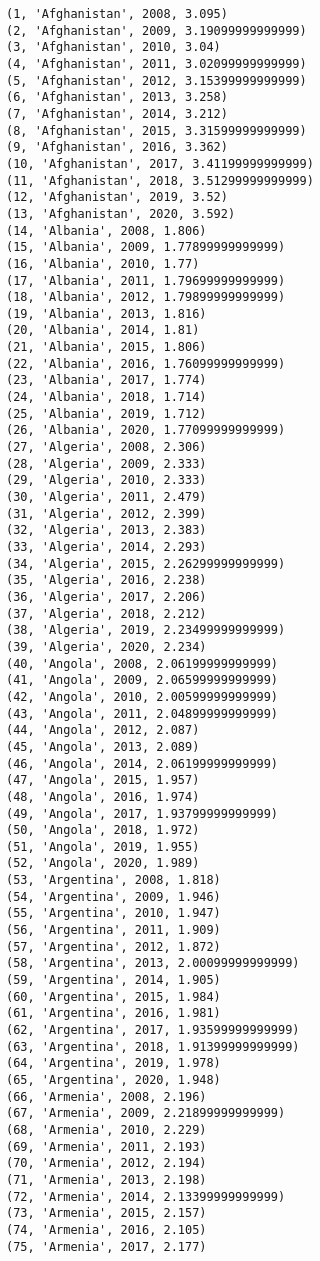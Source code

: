\documentclass[11pt]{article}
\begin{document}
    \begin{Verbatim}[commandchars=\\\{\}]
(1, 'Afghanistan', 2008, 3.095)
(2, 'Afghanistan', 2009, 3.19099999999999)
(3, 'Afghanistan', 2010, 3.04)
(4, 'Afghanistan', 2011, 3.02099999999999)
(5, 'Afghanistan', 2012, 3.15399999999999)
(6, 'Afghanistan', 2013, 3.258)
(7, 'Afghanistan', 2014, 3.212)
(8, 'Afghanistan', 2015, 3.31599999999999)
(9, 'Afghanistan', 2016, 3.362)
(10, 'Afghanistan', 2017, 3.41199999999999)
(11, 'Afghanistan', 2018, 3.51299999999999)
(12, 'Afghanistan', 2019, 3.52)
(13, 'Afghanistan', 2020, 3.592)
(14, 'Albania', 2008, 1.806)
(15, 'Albania', 2009, 1.77899999999999)
(16, 'Albania', 2010, 1.77)
(17, 'Albania', 2011, 1.79699999999999)
(18, 'Albania', 2012, 1.79899999999999)
(19, 'Albania', 2013, 1.816)
(20, 'Albania', 2014, 1.81)
(21, 'Albania', 2015, 1.806)
(22, 'Albania', 2016, 1.76099999999999)
(23, 'Albania', 2017, 1.774)
(24, 'Albania', 2018, 1.714)
(25, 'Albania', 2019, 1.712)
(26, 'Albania', 2020, 1.77099999999999)
(27, 'Algeria', 2008, 2.306)
(28, 'Algeria', 2009, 2.333)
(29, 'Algeria', 2010, 2.333)
(30, 'Algeria', 2011, 2.479)
(31, 'Algeria', 2012, 2.399)
(32, 'Algeria', 2013, 2.383)
(33, 'Algeria', 2014, 2.293)
(34, 'Algeria', 2015, 2.26299999999999)
(35, 'Algeria', 2016, 2.238)
(36, 'Algeria', 2017, 2.206)
(37, 'Algeria', 2018, 2.212)
(38, 'Algeria', 2019, 2.23499999999999)
(39, 'Algeria', 2020, 2.234)
(40, 'Angola', 2008, 2.06199999999999)
(41, 'Angola', 2009, 2.06599999999999)
(42, 'Angola', 2010, 2.00599999999999)
(43, 'Angola', 2011, 2.04899999999999)
(44, 'Angola', 2012, 2.087)
(45, 'Angola', 2013, 2.089)
(46, 'Angola', 2014, 2.06199999999999)
(47, 'Angola', 2015, 1.957)
(48, 'Angola', 2016, 1.974)
(49, 'Angola', 2017, 1.93799999999999)
(50, 'Angola', 2018, 1.972)
(51, 'Angola', 2019, 1.955)
(52, 'Angola', 2020, 1.989)
(53, 'Argentina', 2008, 1.818)
(54, 'Argentina', 2009, 1.946)
(55, 'Argentina', 2010, 1.947)
(56, 'Argentina', 2011, 1.909)
(57, 'Argentina', 2012, 1.872)
(58, 'Argentina', 2013, 2.00099999999999)
(59, 'Argentina', 2014, 1.905)
(60, 'Argentina', 2015, 1.984)
(61, 'Argentina', 2016, 1.981)
(62, 'Argentina', 2017, 1.93599999999999)
(63, 'Argentina', 2018, 1.91399999999999)
(64, 'Argentina', 2019, 1.978)
(65, 'Argentina', 2020, 1.948)
(66, 'Armenia', 2008, 2.196)
(67, 'Armenia', 2009, 2.21899999999999)
(68, 'Armenia', 2010, 2.229)
(69, 'Armenia', 2011, 2.193)
(70, 'Armenia', 2012, 2.194)
(71, 'Armenia', 2013, 2.198)
(72, 'Armenia', 2014, 2.13399999999999)
(73, 'Armenia', 2015, 2.157)
(74, 'Armenia', 2016, 2.105)
(75, 'Armenia', 2017, 2.177)

\end{Verbatim}
\end{document}
